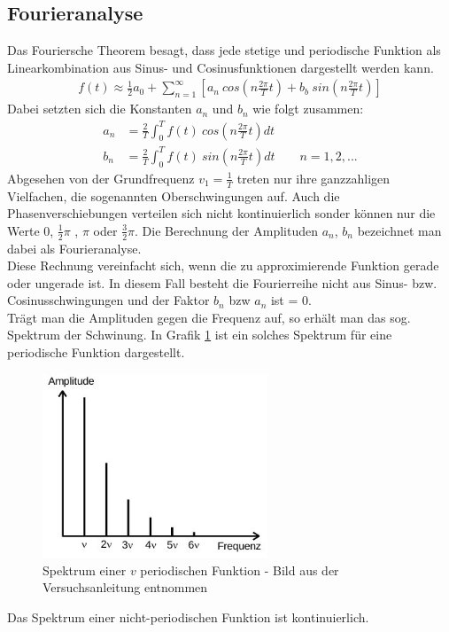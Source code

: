 \subsection{Fourieranalyse}
Das Fouriersche Theorem besagt, dass jede stetige und periodische Funktion als Linearkombination aus Sinus- und Cosinusfunktionen dargestellt werden kann. 
\begin{align}
f(t)\approx \frac{1}{2} a_0 + \sum^\infty_{n=1} \left[ a_n~cos\left(n\frac{2\pi}{T}t\right)+ b_b~ sin\left(n\frac{2\pi}{T}t\right)\right]
\label{eq_fanalyse}
\end{align}
Dabei setzten sich die Konstanten $a_n$ und $b_n$ wie folgt zusammen:
\begin{align}
 a_n&=\frac{2}{T}\int^T_{0} f(t)~cos\left(n\frac{2\pi}{T}t\right) dt\\
 b_n&=\frac{2}{T}\int^T_{0} f(t)~sin\left(n\frac{2\pi}{T}t\right) dt \qquad n=1,2,...
\end{align}
Abgesehen von der Grundfrequenz $v_1 =\frac{1}{T}$ treten nur ihre ganzzahligen Vielfachen, die sogenannten Oberschwingungen auf. Auch die Phasenverschiebungen verteilen sich nicht kontinuierlich sonder können nur die Werte 0, $\frac{1}{2}\pi$ , $\pi$ oder $\frac{3}{2}\pi$. Die Berechnung der Amplituden $a_n$, $b_n$ bezeichnet man dabei als Fourieranalyse.\\
Diese Rechnung vereinfacht sich, wenn die zu approximierende Funktion gerade oder ungerade ist. In diesem Fall besteht die Fourierreihe nicht aus Sinus- bzw. Cosinusschwingungen und der Faktor $b_n$ bzw $a_n$ ist = 0.\\
Trägt man die Amplituden gegen die Frequenz auf, so erhält man das sog. Spektrum der Schwinung. In Grafik \ref{pic_spec} ist ein solches Spektrum für eine periodische Funktion dargestellt. 
\begin{figure}[htbp]
\includegraphics[width=0.6\textwidth]{pics/amplitude_frequenz.jpeg}
\caption{Spektrum einer $v$ periodischen Funktion - Bild aus der Versuchsanleitung entnommen}
\label{pic_spec}
\end{figure} Das Spektrum einer nicht-periodischen Funktion ist kontinuierlich.\\

